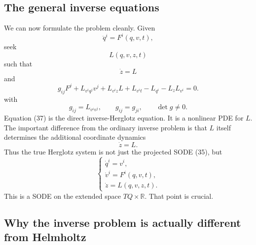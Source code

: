 \subsection{The general inverse equations}

We can now formulate the problem cleanly.
Given
\begin{equation}
 \boxed{ \ddot q^i=F^i(q,v,t), } \tag{35} 
\end{equation}
seek
$$ L(q,v,z,t) $$
such that
\begin{equation}
 \dot z=L \tag{36} 
\end{equation}
and
\begin{equation}
 \boxed{ g_{ij}F^j + L_{v^iq^j}v^j + L_{v^iz}L + L_{v^it} - L_{q^i} - L_zL_{v^i} =0. } \tag{37} 
\end{equation}
with
\begin{equation}
 \boxed{ g_{ij}=L_{v^iv^j},\qquad g_{ij}=g_{ji},\qquad \det g\ne0. } \tag{38} 
\end{equation}
Equation (37) is the direct inverse-Herglotz equation.
It is a nonlinear PDE for \(L\).
The important difference from the ordinary inverse problem is that \(L\) itself determines the additional coordinate dynamics
$$ \dot z=L. $$
Thus the true Herglotz system is not just the projected SODE (35), but
\begin{equation}
 \boxed{ \begin{cases} \dot q^i=v^i,\\[2mm] \dot v^i=F^i(q,v,t),\\[2mm] \dot z=L(q,v,z,t). \end{cases}} \tag{39} 
\end{equation}
This is a SODE on the extended space \(TQ\times\mathbb R\).
That point is crucial.

\subsection{Why the inverse problem is actually different from Helmholtz}

